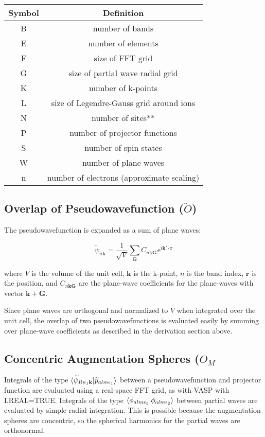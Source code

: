 \documentclass[12pt]{article}
\begin{document}
\begin{table}
\begin{tabular}{c|c}
Symbol & Definition\\
\hline
B & number of bands\\
E & number of elements\\
F & size of FFT grid\\
G & size of partial wave radial grid\\
K & number of k-points\\
L & size of Legendre-Gauss grid around ions\\
N & number of sites**\\
P & number of projector functions\\
S & number of spin states\\
W & number of plane waves\\
n & number of electrons (approximate scaling)
\end{tabular}
\end{table}

\subsection{Overlap of Pseudowavefunction ($\widetilde{O}$)}

The pseudowavefunction is expanded as a sum of plane waves:

\begin{equation}
\widetilde{\psi}_{n\mathbf{k}} =\frac{1}{\sqrt{V}}\sum_{\mathbf{G}}
C_{n\mathbf{k}\mathbf{G}}e^{i\mathbf{k'}\cdot \mathbf{r}}
\label{eq:pswf}
\end{equation}

where $V$ is the volume of the unit cell, $\mathbf{k}$ is the k-point,
$n$ is the band index, $\mathbf{r}$ is the position, and $C_{n\mathbf{k}\mathbf{G}}$
are the plane-wave coefficients for the plane-waves with vector $\mathbf{k+G}$.

Since plane waves are orthogonal and normalized to $V$ when integrated over the
unit cell, the overlap of two pseudowavefunctions is evaluated easily
by summing over plane-wave coefficients as described in the derivation section
above.

\subsection{Concentric Augmentation Spheres ($O_M$}

Integrals of the type $\braket{\widetilde{\psi}_{Rn_1\mathbf{k}}|\widetilde{p}_{alm\epsilon _1}}$
between a pseudowavefunction and projector function are evaluated using a real-space
FFT grid, as with VASP with LREAL=TRUE.\cite{vasp} Integrals of the
type $\braket{\phi_{alm\epsilon _1}|{\phi_{alm\epsilon _2}}}$ between partial waves
are evaluated by simple radial integration. This is possible because the augmentation
spheres are concentric, so the spherical harmonics for the partial waves
are orthonormal.
\end{document}
